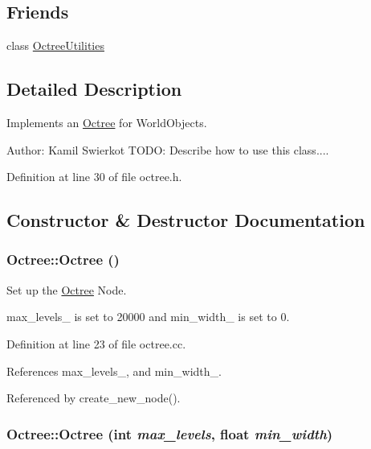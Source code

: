 \subsection*{Friends}
\begin{CompactItemize}
\item 
\hypertarget{class_octree_836eb2cdddfa75db7fe8368e211bbe65}{
class \hyperlink{class_octree_836eb2cdddfa75db7fe8368e211bbe65}{OctreeUtilities}}
\label{class_octree_836eb2cdddfa75db7fe8368e211bbe65}

\end{CompactItemize}


\subsection{Detailed Description}
Implements an \hyperlink{class_octree}{Octree} for WorldObjects. 

\begin{Desc}
\item[Author:]Kamil Swierkot TODO: Describe how to use this class.... \end{Desc}


Definition at line 30 of file octree.h.

\subsection{Constructor \& Destructor Documentation}
\hypertarget{class_octree_5a8d6069e6a7848f8f1df2a4975cd446}{
\subsubsection[Octree]{\setlength{\rightskip}{0pt plus 5cm}Octree::Octree ()}}
\label{class_octree_5a8d6069e6a7848f8f1df2a4975cd446}


Set up the \hyperlink{class_octree}{Octree} Node. 

max\_\-levels\_\- is set to 20000 and min\_\-width\_\- is set to 0. 

Definition at line 23 of file octree.cc.

References max\_\-levels\_\-, and min\_\-width\_\-.

Referenced by create\_\-new\_\-node().\hypertarget{class_octree_1fba0564f41c14943a79fc874e92a60d}{
\subsubsection[Octree]{\setlength{\rightskip}{0pt plus 5cm}Octree::Octree (int {\em max\_\-levels}, \/  float {\em min\_\-width})}}
\label{class_octree_1fba0564f41c14943a79fc874e92a60d}



